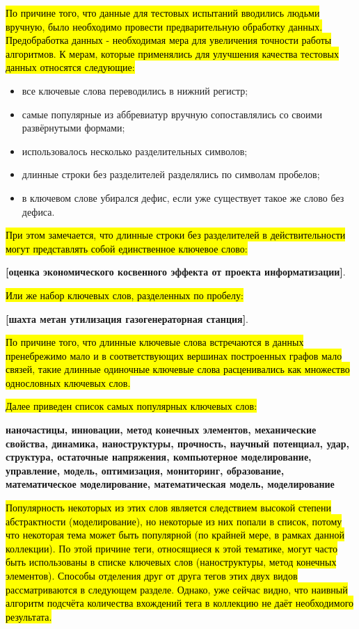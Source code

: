 \hl{По причине того, что данные для тестовых испытаний вводились людьми вручную, было необходимо провести предварительную обработку данных. Предобработка данных - необходимая мера для увеличения точности работы алгоритмов. К мерам, которые применялись для улучшения качества тестовых данных относятся следующие:}

\begin{itemize}
    \item все ключевые слова переводились в нижний регистр;
    \item самые популярные из аббревиатур вручную сопоставлялись со своими развёрнутыми формами;
    \item использовалось несколько разделительных символов;
    \item длинные строки без разделителей разделялись по символам пробелов;
    \item в ключевом слове убирался дефис, если уже существует такое же слово без дефиса.
\end{itemize}

\hl{При этом замечается, что длинные строки без разделителей в действительности могут представлять собой единственное ключевое слово:}

\textbf{[оценка экономического косвенного эффекта от проекта информатизации]}.\

\hl{Или же набор ключевых слов, разделенных по пробелу:}

\textbf{[шахта метан утилизация газогенераторная станция]}.\

\hl{По причине того, что длинные ключевые слова встречаются в данных пренебрежимо мало и в соответствующих вершинах построенных графов мало связей, такие длинные одиночные ключевые слова расценивались как множество однословных ключевых слов.}

\hl{Далее приведен список самых популярных ключевых слов:}

\textbf{наночастицы, инновации, метод конечных элементов, механические свойства, динамика, наноструктуры, прочность, научный потенциал, удар, структура, остаточные напряжения, компьютерное моделирование, управление, модель, оптимизация, мониторинг, образование, математическое моделирование, математическая модель, моделирование}

\hl{Популярность некоторых из этих слов является следствием высокой степени абстрактности (моделирование), но некоторые из них попали в список, потому что некоторая тема может быть популярной (по крайней мере, в рамках данной коллекции). По этой причине теги, относящиеся к этой тематике, могут часто быть использованы в списке ключевых слов (наноструктуры, метод конечных элементов). Способы отделения друг от друга тегов этих двух видов рассматриваются в следующем разделе. Однако, уже сейчас видно, что наивный алгоритм подсчёта количества вхождений тега в коллекцию не даёт необходимого результата.}

